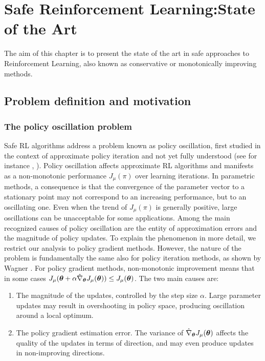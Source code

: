 \chapter{Safe Reinforcement Learning:\newline State of the Art}
The aim of this chapter is to present the state of the art in safe approaches to Reinforcement Learning, also known as conservative or monotonically improving methods. 

\section{Problem definition and motivation}
\subsection{The policy oscillation problem}
Safe \ac{RL} algorithms address a problem known as policy oscillation, first studied in the context of approximate policy iteration and not yet fully understood (see for instance \cite{Bertsekas2011api}, \cite{wagner2011reinterpretation}). Policy oscillation affects approximate \ac{RL} algorithms and manifests as a non-monotonic performance $J_\mu(\pi)$ over learning iterations. In parametric methods, a consequence is that the convergence of the parameter vector to a stationary point may not correspond to an increasing performance, but to an oscillating one. Even when the trend of $J_\mu(\pi)$ is generally positive, large oscillations can be unacceptable for some applications.
Among the main recognized causes of policy oscillation are the entity of approximation errors and the magnitude of policy updates.
To explain the phenomenon in more detail, we restrict our analysis to policy gradient methods. However, the nature of the problem is fundamentally the same also for policy iteration methods, as shown by Wagner \cite{wagner2011reinterpretation}. For policy gradient methods, non-monotonic improvement means that in some cases $J_\mu(\boldsymbol{\theta}+\alpha\hat{\nabla}_{\boldsymbol{\theta}}J_{\mu}(\boldsymbol{\theta})) \leq J_\mu(\boldsymbol{\theta})$. The two main causes are:
\begin{enumerate}
\item The magnitude of the updates, controlled by the step size $\alpha$. Large parameter updates may result in overshooting in policy space, producing oscillation around a local optimum.
\item The policy gradient estimation error. The variance of $\hat{\nabla}_{\boldsymbol{\theta}}J_{\mu}(\boldsymbol{\theta})$ affects the quality of the updates in terms of direction, and may even produce updates in non-improving directions.
\end{enumerate} 

